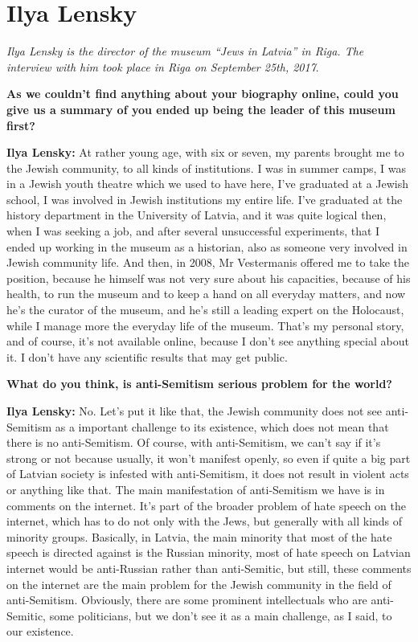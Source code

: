 \section{Ilya Lensky}

\textit{Ilya Lensky is the director of the museum ``Jews in Latvia'' in Riga. The interview with him took place in Riga on September 25th, 2017}.\par
\vspace*{2em}
\textbf{As we couldn’t find anything about your biography online, could you give us a summary of you ended up being the leader of this museum first?}

\textbf{Ilya Lensky:} At rather young age, with six or seven, my parents brought me to the Jewish community, to all kinds of institutions. I was in summer camps, I was in a Jewish youth theatre which we used to have here, I’ve graduated at a Jewish school, I was involved in Jewish institutions my entire life. I’ve graduated at the history department in the University of Latvia, and it was quite logical then, when I was seeking a job, and after several unsuccessful experiments, that I ended up working in the museum as a historian, also as someone very involved in Jewish community life. And then, in 2008, Mr Vestermanis offered me to take the position, because he himself was not very sure about his capacities, because of his health, to run the museum and to keep a hand on all everyday matters, and now he’s the curator of the museum, and he’s still a leading expert on the Holocaust, while I manage more the everyday life of the museum. That’s my personal story, and of course, it’s not available online, because I don’t see anything special about it. I don’t have any scientific results that may get public. 

\textbf{What do you think, is anti-Semitism serious problem for the world?}

\textbf{Ilya Lensky:} No. Let’s put it like that, the Jewish community does not see anti-Semitism as a important challenge to its existence, which does not mean that there is no anti-Semitism. Of course, with anti-Semitism, we can’t say if it’s strong or not because usually, it won’t manifest openly, so even if quite a big part of Latvian society is infested with anti-Semitism, it does not result in violent acts or anything like that. The main manifestation of anti-Semitism we have is in comments on the internet. It’s part of the broader problem of hate speech on the internet, which has to do not only with the Jews, but generally with all kinds of minority groups. Basically, in Latvia, the main minority that most of the hate speech is directed against is the Russian minority, most of hate speech on Latvian internet would be anti-Russian rather than anti-Semitic, but still, these comments on the internet are the main problem for the Jewish community in the field of anti-Semitism. Obviously, there are some prominent intellectuals who are anti-Semitic, some politicians, but we don’t see it as a main challenge, as I said, to our existence. 

